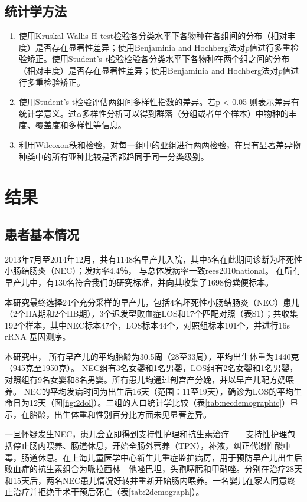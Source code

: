   \subsection{统计学方法}
  \label{统计学方法}
    \begin{enumerate}
      \item 使用Kruskal-Wallis H test检验各分类水平下各物种在各组间的分布（相对丰度）是否存在显著性差异；使用Benjaminia and Hochberg法对\textit{p}值进行多重检验矫正。使用Student’s \textit{t}检验检验各分类水平下各物种在两个组之间的分布（相对丰度）是否存在显著性差异；使用Benjaminia and Hochberg法对\textit{p}值进行多重检验矫正。
      \item 使用Student’s t检验评估两组间多样性指数的差异。若p < 0.05 则表示差异有统计学意义。过$\alpha$多样性分析可以得到群落（分组或者单个样本）中物种的丰度、覆盖度和多样性等信息。
      \item 利用Wilcoxon秩和检验，对每一组中的亚组进行两两检验，在具有显著差异物种类中的所有亚种比较是否都趋同于同一分类级别。
    \end{enumerate}

\section{结果}
  \subsection{患者基本情况}
  2013年7月至2014年12月，共有1148名早产儿入院，其中5名在此期间诊断为坏死性小肠结肠炎（NEC）；发病率4.4％， 与总体发病率一致{rees2010national}。 在所有早产儿中，有130名符合我们的研究标准，并向其收集了1698份粪便标本。

  本研究最终选择24个充分采样的早产儿，包括4名坏死性小肠结肠炎（NEC）患儿（2个IIA期和2个IIB期），3个迟发型败血症LOS和17个匹配对照（表S1）；共收集192个样本，其中NEC标本47个，LOS标本44个，对照组标本101个，并进行16s rRNA 基因测序。

  本研究中， 所有早产儿的平均胎龄为30.5周（28至33周），平均出生体重为1440克（945克至1950克）。 NEC组有3名女婴和1名男婴，LOS组有2名女婴和1名男婴，对照组有9名女婴和8名男婴。所有患儿均通过剖宫产分娩，并以早产儿配方奶喂养。 NEC的平均发病时间为出生后16天（范围：11至19天），确诊为LOS的平均生命日为12天（图\ref{fig:2dol}）。三组的人口统计学比较（表\ref{tab:necdemographic}）显示，在胎龄，出生体重和性别百分比方面未见显著差异。

  一旦怀疑发生NEC，患儿会立即得到支持性护理和抗生素治疗——支持性护理包括停止肠内喂养、肠道休息，开始全肠外营养（TPN），补液，纠正代谢性酸中毒，肠道休息。在上海儿童医学中心新生儿重症监护病房，用于预防早产儿出生后败血症的抗生素组合为哌拉西林 - 他唑巴坦，头孢噻肟和甲硝唑。分别在治疗28天和15天后，两名NEC患儿情况好转并重新开始肠内喂养。一名婴儿在家人同意终止治疗并拒绝手术干预后死亡（表\ref{tab:2demograph}）。

